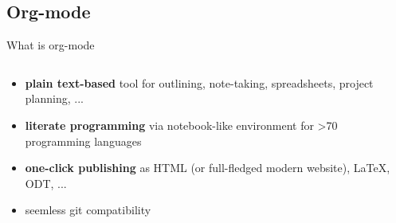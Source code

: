 \documentclass[10pt,aspectratio=169]{beamer}
\begin{document}
\subsection{Org-mode}
\begin{frame}{What is org-mode}
    \begin{columns}[c]
    \begin{column}{.3\textwidth} %
    \begin{minipage}{1\textwidth}
    \begin{itemize}
        \item<1>\textbf{plain text-based} tool for outlining, note-taking, spreadsheets, project planning, ...
        \item<2>\textbf{literate programming} via notebook-like environment for >70 programming languages
        \item<3>\textbf{one-click publishing} as HTML (or full-fledged modern website), LaTeX, ODT, ...
        \item<4>seemless git compatibility
    \end{itemize}
    \end{minipage}
    \end{column}
    \begin{column}{.7\textwidth} %
\end{column}
\end{columns}
\end{frame}
\end{document}
